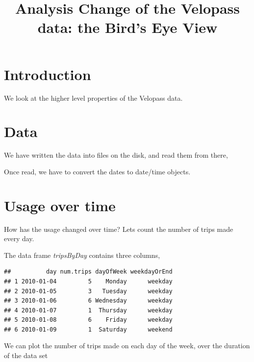 \documentclass[]{article}
\title{Analysis Change of the Velopass data: the Bird's Eye View}
\author{}
\date{}
\begin{document}
\maketitle


\section{Introduction}\label{introduction}

We look at the higher level properties of the Velopass data.

\section{Data}\label{data}

We have written the data into files on the disk, and read them from
there,

Once read, we have to convert the dates to date/time objects.

\section{Usage over time}\label{usage-over-time}

How has the usage changed over time? Lets count the number of trips made
every day.

The data frame \emph{tripsByDay} contains three columns,

\begin{verbatim}
##          day num.trips dayOfWeek weekdayOrEnd
## 1 2010-01-04         5    Monday      weekday
## 2 2010-01-05         3   Tuesday      weekday
## 3 2010-01-06         6 Wednesday      weekday
## 4 2010-01-07         1  Thursday      weekday
## 5 2010-01-08         6    Friday      weekday
## 6 2010-01-09         1  Saturday      weekend
\end{verbatim}

We can plot the number of trips made on each day of the week, over the
duration of the data set
\end{document}
